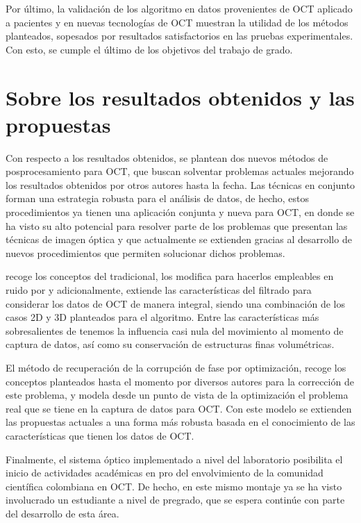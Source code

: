 Por último, la validación de los algoritmo en datos provenientes de OCT aplicado a pacientes y en nuevas tecnologías de OCT muestran la utilidad de los métodos planteados, sopesados por resultados satisfactorios en las pruebas experimentales. Con esto, se cumple el último de los objetivos del trabajo de grado.

\section{Sobre los resultados obtenidos y las propuestas}

Con respecto a los resultados obtenidos, se plantean dos nuevos métodos de posprocesamiento para OCT, que buscan solventar problemas actuales mejorando los resultados obtenidos por otros autores hasta la fecha. Las técnicas en conjunto forman una estrategia robusta para el análisis de datos, de hecho, estos procedimientos ya tienen una aplicación conjunta y nueva para OCT, en donde se ha visto su alto potencial para resolver parte de los problemas que presentan las técnicas de imagen óptica y que actualmente se extienden gracias al desarrollo de nuevos procedimientos que permiten solucionar dichos problemas.

\nlmeansOCT recoge los conceptos del \nlmeans tradicional, los modifica para hacerlos empleables en ruido por \speckle y adicionalmente, extiende las características del filtrado para considerar los datos de OCT de manera integral, siendo una combinación de los casos 2D y 3D planteados para el algoritmo. Entre las características más sobresalientes de \nlmeansOCT tenemos la influencia casi nula del movimiento al momento de captura de datos, así como su conservación de estructuras finas volumétricas. 

El método de recuperación de la corrupción de fase por optimización, recoge los conceptos planteados hasta el momento por diversos autores para la corrección de este problema, y modela desde un punto de vista de la optimización el problema real que se tiene en la captura de datos para OCT. Con este modelo se extienden las propuestas actuales a una forma más robusta basada en el conocimiento de las características que tienen los datos de OCT.

Finalmente, el sistema óptico implementado a nivel del laboratorio posibilita el inicio de actividades académicas en pro del envolvimiento de la comunidad científica colombiana en OCT. De hecho, en este mismo montaje ya se ha visto involucrado un estudiante a nivel de pregrado, que se espera continúe con parte del desarrollo de esta área.

